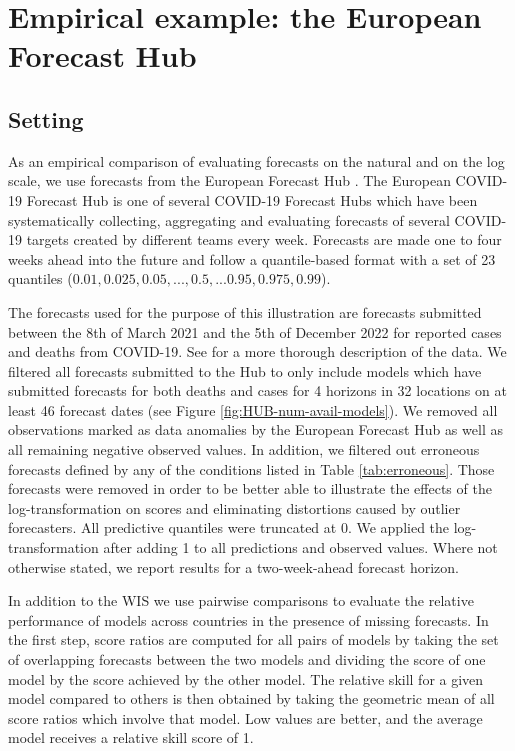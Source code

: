 \documentclass{article}
\begin{document}
\section{Empirical example: the European Forecast Hub}
\label{sec:results}

\subsection{Setting}
\label{sec:HUB-setting}

As an empirical comparison of evaluating forecasts on the natural and on the log scale, we use forecasts from the European Forecast Hub \citep{europeancovid-19forecasthubEuropeanCovid19Forecast2021, sherrattPredictivePerformanceMultimodel2022}. 
The European COVID-19 Forecast Hub is one of several COVID-19 Forecast Hubs \citep{cramerEvaluationIndividualEnsemble2021, bracherShorttermForecastingCOVID192021} which have been systematically collecting, aggregating and evaluating forecasts of several COVID-19 targets created by different teams every week. Forecasts are made one to four weeks ahead into the future and follow a quantile-based format with a set of 23 quantiles ($0.01, 0.025, 0.05, ..., 0.5, ... 0.95, 0.975, 0.99$). 

The forecasts used for the purpose of this illustration are forecasts submitted between the 8th of March 2021 and the 5th of December 2022 for reported cases and deaths from COVID-19. See \cite{sherrattPredictivePerformanceMultimodel2022} for a more thorough description of the data. We filtered all forecasts submitted to the Hub to only include models which have submitted forecasts for both deaths and cases for 4 horizons in 32 locations on at least 46 forecast dates (see Figure \ref{fig:HUB-num-avail-models}). We removed all observations marked as data anomalies by the European Forecast Hub \citep{sherrattPredictivePerformanceMultimodel2022} as well as all remaining negative observed values. In addition, we filtered out erroneous forecasts defined by any of the conditions listed in Table \ref{tab:erroneous}. Those forecasts were removed in order to be better able to illustrate the effects of the log-transformation on scores and eliminating distortions caused by outlier forecasters. All predictive quantiles were truncated at 0. We applied the log-transformation after adding 1 to all predictions and observed values. Where not otherwise stated, we report results for a two-week-ahead forecast horizon. 

In addition to the WIS we use pairwise comparisons \citep{cramerEvaluationIndividualEnsemble2021} to evaluate the relative performance of models across countries in the presence of missing forecasts. In the first step, score ratios are computed for all pairs of models by taking the set of overlapping forecasts between the two models and dividing the score of one model by the score achieved by the other model. The relative skill for a given model compared to others is then obtained by taking the geometric mean of all score ratios which involve that model. Low values are better, and the average model receives a relative skill score of 1. 
\end{document}

